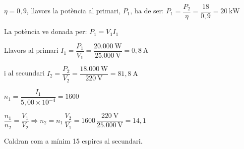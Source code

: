 \begin{solapartat}
 $\eta = 0,9$, llavors la potència al primari, $P_1$, ha de ser: $P_1 = \dfrac{P_2}{\eta} = \dfrac{18}{0,9} = 20\ \mathrm{kW}$

 La potència ve donada per: $P_1 = V_1 I_1$

 Llavors al primari $I_1 = \dfrac{P_1}{V_1} = \dfrac{20.000\ \mathrm{W}}{25.000\ \mathrm{V}} = 0,8\ \mathrm{A}$

 i al secundari $I_2 = \dfrac{P_2}{V_2} = \dfrac{18.000\ \mathrm{W}}{220\ \mathrm{V}} = 81,8\ \mathrm{A}$
\end{solapartat}

\begin{solapartat}
 $n_1 = \dfrac{I_1}{5,00\times 10^{-4}} = 1600$

 $\dfrac{n_1}{n_2} = \dfrac{V_1}{V_2} \Rightarrow n_2 = n_1\,\dfrac{V_2}{V_1} = 1600\,\dfrac{220\ \mathrm{V}}{25.000\ \mathrm{V}} = 14,1$

 Caldran com a mínim 15 espires al secundari.
\end{solapartat}
